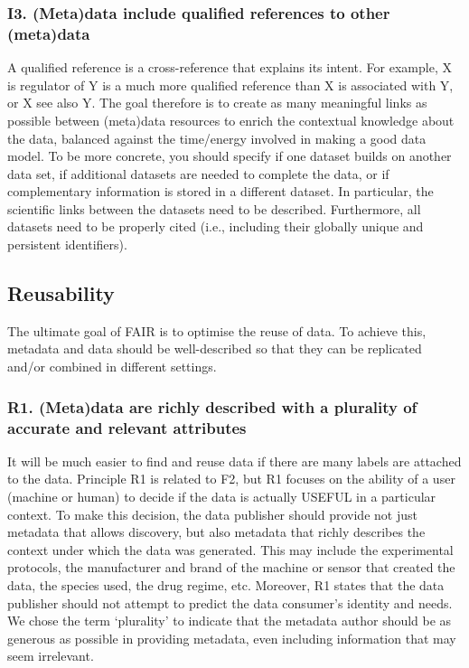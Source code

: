 \subsubsection*{I3. (Meta)data include qualified references to other (meta)data}
A qualified reference is a cross-reference that explains its intent. For example, X is regulator of Y is a much more qualified reference than X is associated with Y, or X see also Y. The goal therefore is to create as many meaningful links as possible between (meta)data resources to enrich the contextual knowledge about the data, balanced against the time/energy involved in making a good data model. To be more concrete, you should specify if one dataset builds on another data set, if additional datasets are needed to complete the data, or if complementary information is stored in a different dataset. In particular, the scientific links between the datasets need to be described. Furthermore, all datasets need to be properly cited (i.e., including their globally unique and persistent identifiers).






\subsection*{Reusability}
The ultimate goal of FAIR is to optimise the reuse of data. To achieve this, metadata and data should be well-described so that they can be replicated and/or combined in different settings.





\subsubsection*{R1. (Meta)data are richly described with a plurality of accurate and relevant attributes}
It will be much easier to find and reuse data if there are many labels are attached to the data. Principle R1 is related to F2, but R1 focuses on the ability of a user (machine or human) to decide if the data is actually USEFUL in a particular context. To make this decision, the data publisher should provide not just metadata that allows discovery, but also metadata that richly describes the context under which the data was generated. This may include the experimental protocols, the manufacturer and brand of the machine or sensor that created the data, the species used, the drug regime, etc. Moreover, R1 states that the data publisher should not attempt to predict the data consumer’s identity and needs. We chose the term ‘plurality’ to indicate that the metadata author should be as generous as possible in providing metadata, even including information that may seem irrelevant.


